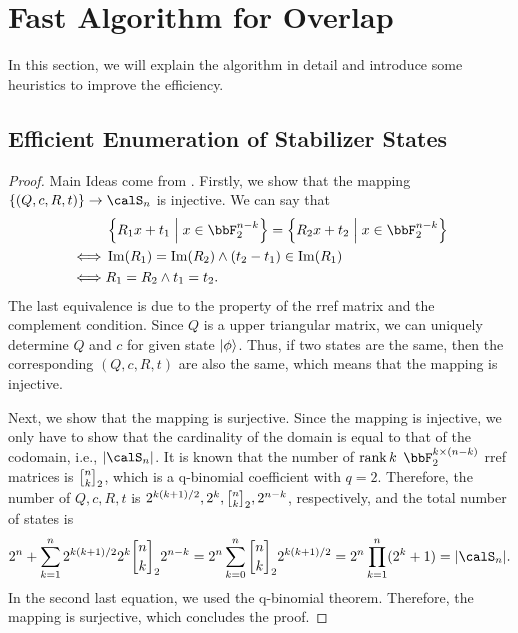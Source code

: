 \documentclass[\main/main]{subfiles}
\begin{document}
\section{Fast Algorithm for Overlap}

In this section, we will explain the algorithm in detail
and introduce some heuristics to improve the efficiency.

\subsection{Efficient Enumeration of Stabilizer States}
\label{sec:efficientEnumeration}

\begin{proof}
  Main Ideas come from \cite{struchalinExperimentalEstimationQuantum2021b}.
  Firstly, we show that the mapping $\{(Q,c,R,t)\} \to \calS_n$ is injective.
  We can say that
  \begin{align*}
         & \left\{R_1 x + t_1 \;\middle|\; x \in \bbF_2^{n-k} \right\} = \left\{R_2 x + t_2 \;\middle|\; x \in \bbF_2^{n-k} \right\} \\
    \iff & \Im(R_1)=\Im(R_2) \land (t_2-t_1) \in \Im(R_1)                                                                            \\
    \iff & R_1 = R_2 \land t_1 = t_2.
  \end{align*}
  The last equivalence is due to the
  property of the rref matrix and the complement condition.
  Since $Q$ is a upper triangular matrix,
  we can uniquely determine $Q$ and $c$
  for given state $\ket{\phi}$.
  Thus, if two states are the same,
  then the corresponding $(Q,c,R,t)$ are also the same,
  which means that the mapping is injective.

  Next, we show that the mapping is surjective.
  Since the mapping is injective, we only have to show
  that the cardinality of the domain is equal to that of the codomain, i.e., $\abs{\calS_n}$.
  It is known that the number of $\rank k$ $\bbF_2^{k \times (n-k)}$ rref matrices is
  $\qBinom{n}{k}_2$, which is a q-binomial coefficient with $q=2$.
  Therefore, the number of $Q,c,R,t$ is
  $2^{k(k+1)/2},2^k,\qBinom{n}{k}_2,2^{n-k}$, respectively,
  and the total number of states is
  \begin{equation*}
    2^n + \sum_{k=1}^{n} 2^{k(k+1)/2} 2^k \qBinom{n}{k}_2 2^{n-k} \\
    = 2^n \sum_{k=0}^{n} \qBinom{n}{k}_2 2^{k(k+1)/2}               \\
    = 2^n \prod_{k=1}^{n} (2^k+1)
    = \abs{\calS_n}.
  \end{equation*}
  In the second last equation, we used the q-binomial theorem.
  Therefore, the mapping is surjective, which concludes the proof.
\end{proof}
\end{document}

